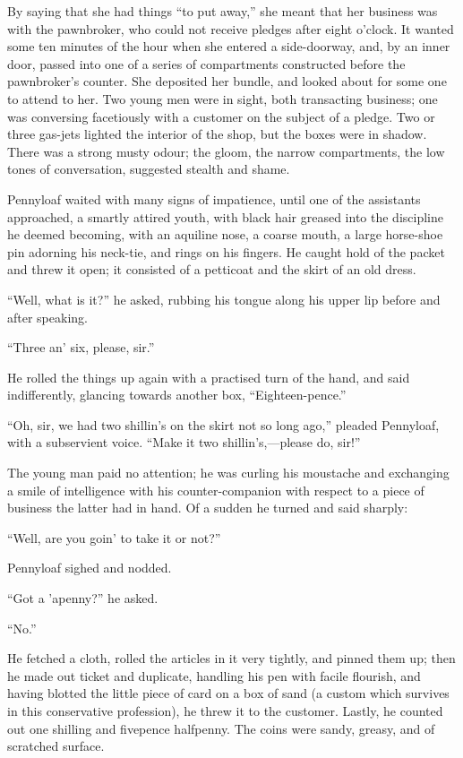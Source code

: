 By saying that she had things ``to put away,'' she meant that her
business was with the pawnbroker, who could not receive pledges after
eight o'clock. It wanted some ten minutes of the hour when she entered a
side-doorway, and, by an inner door, passed into one of a series of
compartments constructed before the pawnbroker's counter. She deposited
her bundle, and looked about for some one to attend to her. Two young
men were in sight, both transacting business; {}one was conversing
facetiously with a customer on the subject of a pledge. Two or three
gas-jets lighted the interior of the shop, but the boxes were in shadow.
There was a strong musty odour; the gloom, the narrow compartments, the
low tones of conversation, suggested stealth and shame.

Pennyloaf waited with many signs of impatience, until one of the
assistants approached, a smartly attired youth, with black hair greased
into the discipline he deemed becoming, with an aquiline nose, a coarse
mouth, a large horse-shoe pin adorning his neck-tie, and rings on his
fingers. He caught hold of the packet and threw it open; it consisted of
a petticoat and the skirt of an old dress.

``Well, what is it?'' he asked, rubbing his tongue along his upper lip
before and after speaking.

``Three an' six, please, sir.''

He rolled the things up again with a practised turn of the hand, and
said indifferently, glancing towards another box, ``Eighteen-pence.''

{}``Oh, sir, we had two shillin's on the skirt not so long ago,''
pleaded Pennyloaf, with a subservient voice. ``Make it two
shillin's,---please do, sir!''

The young man paid no attention; he was curling his moustache and
exchanging a smile of intelligence with his counter-companion with
respect to a piece of business the latter had in hand. Of a sudden he
turned and said sharply:

``Well, are you goin' to take it or not?''

Pennyloaf sighed and nodded.

``Got a 'apenny?'' he asked.

``No.''

He fetched a cloth, rolled the articles in it very tightly, and pinned
them up; then he made out ticket and duplicate, handling his pen with
facile flourish, and having blotted the little piece of card on a box of
sand (a custom which survives in this conservative profession), he threw
it to the customer. Lastly, he counted out one shilling and fivepence
halfpenny. The coins were sandy, greasy, and of scratched surface.

